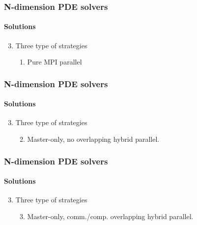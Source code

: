 \begin{frame}
  \frametitle{N-dimension PDE solvers}
  \framesubtitle{Solutions}
  \begin{enumerate}
    \setcounter{enumi}{2}
    \item Three type of strategies
    \begin{enumerate}
      \item Pure MPI parallel
    \end{enumerate}
  \end{enumerate}
\end{frame}


\begin{frame}
  \frametitle{N-dimension PDE solvers}
  \framesubtitle{Solutions}
  \begin{enumerate}
    \setcounter{enumi}{2}
    \item Three type of strategies
    \begin{enumerate}
      \setcounter{enumi}{1}
      \item Master-only, no overlapping hybrid parallel.
    \end{enumerate}
  \end{enumerate}
\end{frame}

\begin{frame}
  \frametitle{N-dimension PDE solvers}
  \framesubtitle{Solutions}
  \begin{enumerate}
    \setcounter{enumi}{2}
    \item Three type of strategies
    \begin{enumerate}
      \setcounter{enumi}{2}
      \item Master-only, comm./comp. overlapping hybrid parallel.
    \end{enumerate}
  \end{enumerate}
\end{frame}



